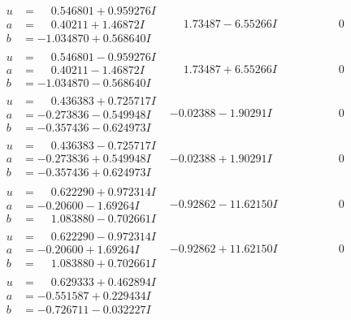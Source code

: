 \documentclass[1p]{elsarticle_modified}
\theoremstyle{definition}
\begin{document}
$$\begin{array}{c|c|c}
\begin{aligned}
u &= \phantom{-}0.546801 + 0.959276 I \\
a &= \phantom{-}0.40211 + 1.46872 I \\
b &= -1.034870 + 0.568640 I\end{aligned}
 & \phantom{-}1.73487 - 6.55266 I & \phantom{-0.000000 } 0 \\ \hline\begin{aligned}
u &= \phantom{-}0.546801 - 0.959276 I \\
a &= \phantom{-}0.40211 - 1.46872 I \\
b &= -1.034870 - 0.568640 I\end{aligned}
 & \phantom{-}1.73487 + 6.55266 I & \phantom{-0.000000 } 0 \\ \hline\begin{aligned}
u &= \phantom{-}0.436383 + 0.725717 I \\
a &= -0.273836 - 0.549948 I \\
b &= -0.357436 - 0.624973 I\end{aligned}
 & -0.02388 - 1.90291 I & \phantom{-0.000000 } 0 \\ \hline\begin{aligned}
u &= \phantom{-}0.436383 - 0.725717 I \\
a &= -0.273836 + 0.549948 I \\
b &= -0.357436 + 0.624973 I\end{aligned}
 & -0.02388 + 1.90291 I & \phantom{-0.000000 } 0 \\ \hline\begin{aligned}
u &= \phantom{-}0.622290 + 0.972314 I \\
a &= -0.20600 - 1.69264 I \\
b &= \phantom{-}1.083880 - 0.702661 I\end{aligned}
 & -0.92862 - 11.62150 I & \phantom{-0.000000 } 0 \\ \hline\begin{aligned}
u &= \phantom{-}0.622290 - 0.972314 I \\
a &= -0.20600 + 1.69264 I \\
b &= \phantom{-}1.083880 + 0.702661 I\end{aligned}
 & -0.92862 + 11.62150 I & \phantom{-0.000000 } 0 \\ \hline\begin{aligned}
u &= \phantom{-}0.629333 + 0.462894 I \\
a &= -0.551587 + 0.229434 I \\
b &= -0.726711 - 0.032227 I\end{aligned}

\end{array}$$
\end{document}
